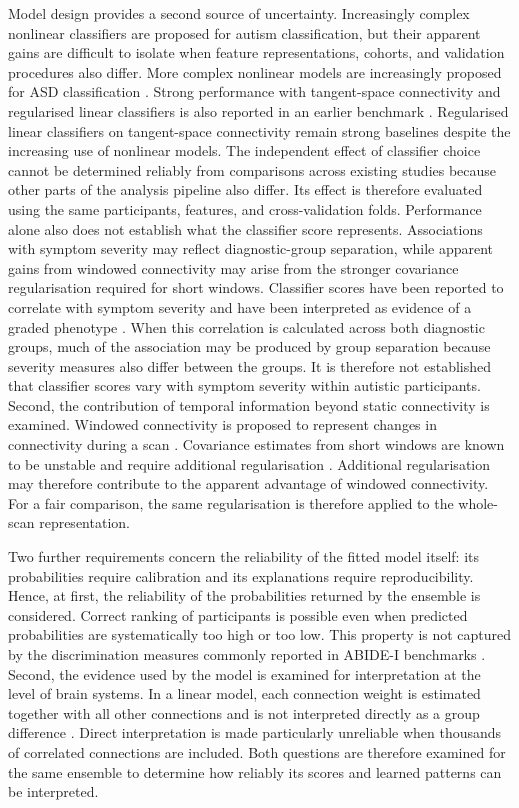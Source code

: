 Model design provides a second source of uncertainty. Increasingly complex nonlinear classifiers are proposed for autism classification, but their apparent gains are difficult to isolate when feature representations, cohorts, and validation procedures also differ. More complex nonlinear models are increasingly proposed for ASD classification \citep{Liuetal2024MADE,Tangetal2025GNNLSTM,Tangetal2026CASGNN}. Strong performance with tangent-space connectivity and regularised linear classifiers is also reported in an earlier benchmark \citep{Dadietal2019}. Regularised linear classifiers on tangent-space connectivity remain strong baselines despite the increasing use of nonlinear models. The independent effect of classifier choice cannot be determined reliably from comparisons across existing studies because other parts of the analysis pipeline also differ. Its effect is therefore evaluated using the same participants, features, and cross-validation folds. Performance alone also does not establish what the classifier score represents. Associations with symptom severity may reflect diagnostic-group separation, while apparent gains from windowed connectivity may arise from the stronger covariance regularisation required for short windows. Classifier scores have been reported to correlate with symptom severity and have been interpreted as evidence of a graded phenotype \citep{Nielsenetal2013}. When this correlation is calculated across both diagnostic groups, much of the association may be produced by group separation because severity measures also differ between the groups. It is therefore not established that classifier scores vary with symptom severity within autistic participants. Second, the contribution of temporal information beyond static connectivity is examined. Windowed connectivity is proposed to represent changes in connectivity during a scan \citep{Hutchisonetal2013,Allenetal2014,Pretietal2017}. Covariance estimates from short windows are known to be unstable and require additional regularisation \citep{LeonardiVanDeVille2015}. Additional regularisation may therefore contribute to the apparent advantage of windowed connectivity. For a fair comparison, the same regularisation is therefore applied to the whole-scan representation.

Two further requirements concern the reliability of the fitted model itself: its probabilities require calibration and its explanations require reproducibility. Hence, at first, the reliability of the probabilities returned by the ensemble is considered. Correct ranking of participants is possible even when predicted probabilities are systematically too high or too low. This property is not captured by the discrimination measures commonly reported in ABIDE-I benchmarks \citep{Guoetal2017,VanCalsteretal2019}. Second, the evidence used by the model is examined for interpretation at the level of brain systems. In a linear model, each connection weight is estimated together with all other connections and is not interpreted directly as a group difference \citep{Haufeetal2014}. Direct interpretation is made particularly unreliable when thousands of correlated connections are included. Both questions are therefore examined for the same ensemble to determine how reliably its scores and learned patterns can be interpreted.


